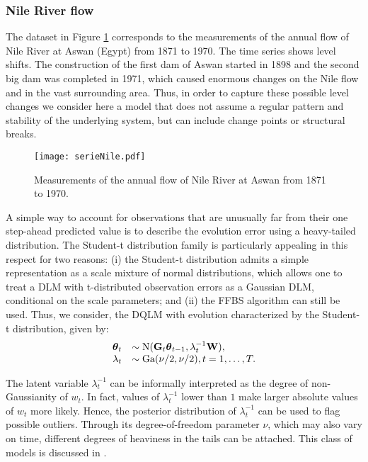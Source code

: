 \documentclass[12pt,a4paper]{article}\usepackage[]{graphicx}\usepackage[]{color}\usepackage{subfigure}
\newcommand{\bftheta}{\boldsymbol{\theta}}
\begin{document}
\subsubsection{Nile River flow}

The dataset in Figure \ref{Nile_data} corresponds to the measurements of the annual flow of Nile River at Aswan (Egypt) from 1871 to 1970. 
The time series shows level shifts. 
The construction of the first dam of Aswan started in 1898 and the second big dam was completed in 1971, which caused enormous changes on the Nile flow and in the vast surrounding area. 
Thus, in order to capture these possible level changes we consider here a model that does not assume a regular pattern and stability of the underlying system, but can include change points or structural breaks.

\begin{figure}[h!]
\begin{center}
\texttt{[image: serieNile.pdf]}
\end{center}
\vspace{-0.8 cm}\caption{Measurements of the annual flow of Nile River at Aswan from 1871 to 1970.}\label{Nile_data}
\end{figure}

A simple way to account for observations that are unusually far from their one step-ahead predicted value is to describe the evolution error using a heavy-tailed distribution. 
The Student-t distribution family is particularly appealing in this respect for two reasons: 
(i) the Student-t distribution admits a simple representation as a scale mixture of normal distributions, which allows one to treat a DLM with t-distributed observation errors as a Gaussian DLM, conditional on the scale parameters; and
(ii) the FFBS algorithm can still be used. %
Thus, we consider, the DQLM with evolution characterized by the Student-t distribution, given by:
\begin{align}\label{tst_model}
\begin{array}{rl}
\bftheta_t &\sim \mbox{N}({\bf G}_t\bftheta_{t-1},\lambda_t^{-1}{\bf W}),\\
\lambda_t & \sim \mbox{Ga} (\nu/2,\nu/2), t=1,\dots,T.
\end{array}
\end{align}

The latent variable $\lambda_t^{-1}$ can be informally interpreted as the degree of non-Gaussianity of $w_t$. In fact, values of $\lambda_t^{-1}$ lower than $1$ make larger absolute values of $w_t$ more likely. 
Hence, the posterior distribution of $\lambda_t^{-1}$ can be used to flag possible outliers. 
Through its degree-of-freedom parameter $\nu$, which may also vary on time, different degrees of heaviness in the tails can be attached. This class of models is discussed in \cite{Petris2009dynamic}.
\end{document}
